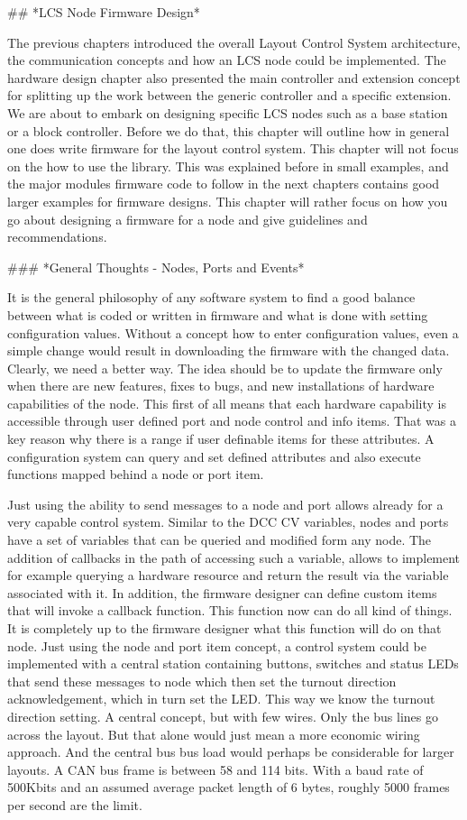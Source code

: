 ## *LCS Node Firmware Design*

The previous chapters introduced the overall Layout Control System architecture, the communication concepts and how an LCS node could be implemented. The hardware design chapter also presented the main controller and extension concept for splitting up the work between the generic controller and a specific extension. We are about to embark on designing specific LCS nodes such as a base station or a block controller. Before we do that, this chapter will outline how in general one does write firmware for the layout control system. This chapter will not focus on the how to use the library. This was explained before in small examples, and the major modules firmware code to follow in the next chapters contains good larger examples for firmware designs. This chapter will rather focus on how you go about designing a firmware for a node and give guidelines and recommendations.

### *General Thoughts - Nodes, Ports and Events*

It is the general philosophy of any software system to find a good balance between what is coded or written in firmware and what is done with setting configuration values. Without a concept how to enter configuration values, even a simple change would result in downloading the firmware with the changed data. Clearly, we need a better way. The idea should be to update the firmware only when there are new features, fixes to bugs, and new installations of hardware capabilities of the node. This first of all means that each hardware capability is accessible through user defined port and node control and info items. That was a key reason why there is a range if user definable items for these attributes. A configuration system can query and set defined attributes and also execute functions mapped behind a node or port item.

Just using the ability to send messages to a node and port allows already for a very capable control system. Similar to the DCC CV variables, nodes and ports have a set of variables that can be queried and modified form any node. The addition of callbacks in the path of accessing such a variable, allows to implement for example querying a hardware resource and return the result via the variable associated with it. In addition, the firmware designer can define custom items that will invoke a callback function. This function now can do all kind of things. It is completely up to the firmware designer what this function will do on that node. Just using the node and port item concept, a control system could be implemented with a central station containing buttons, switches and status LEDs that send these messages to node which then set the turnout direction acknowledgement, which in turn set the LED. This way we know the turnout direction setting. A central concept, but with few wires. Only the bus lines go across the layout. But that alone would just mean a more economic wiring approach. And the central bus bus load would perhaps be considerable for larger layouts. A CAN bus frame is between 58 and 114 bits. With a baud rate of 500Kbits and an assumed average packet length of 6 bytes, roughly 5000 frames per second are the limit.

